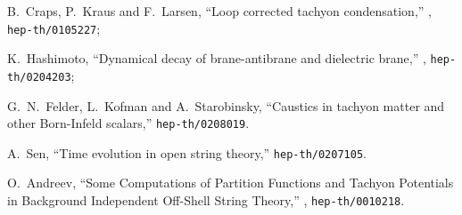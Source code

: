 \documentclass[a4paper,12pt]{article}
\begin{document}
\begin{thebibliography}{99}
B.~Craps, P.~Kraus and F.~Larsen,
``Loop corrected tachyon condensation,''
, {\tt hep-th/0105227};

K.~Hashimoto,
``Dynamical decay of brane-antibrane and dielectric brane,''
, {\tt hep-th/0204203};

G.~N.~Felder, L.~Kofman and A.~Starobinsky,
``Caustics in tachyon matter and other Born-Infeld scalars,''
{\tt hep-th/0208019}.


A.~Sen,
``Time evolution in open string theory,''
{\tt hep-th/0207105}.

O.\ Andreev, 
``Some Computations of Partition Functions and Tachyon Potentials in
        Background Independent Off-Shell String Theory,''
, {\tt hep-th/0010218}.

\end{thebibliography}
\end{document}
